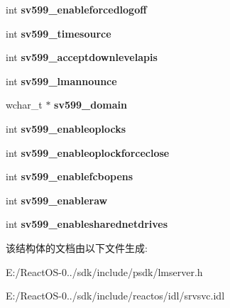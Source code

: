\begin{DoxyCompactItemize}
int {\bfseries sv599\+\_\+enableforcedlogoff}
\item 
\mbox{\label{struct___s_e_r_v_e_r___i_n_f_o__599_a3a3ca489cbe86e802b096e3dfcaddde5}} 
int {\bfseries sv599\+\_\+timesource}
\item 
\mbox{\label{struct___s_e_r_v_e_r___i_n_f_o__599_a28696bd1d75a0c8e34987162ced56291}} 
int {\bfseries sv599\+\_\+acceptdownlevelapis}
\item 
\mbox{\label{struct___s_e_r_v_e_r___i_n_f_o__599_a7f5bd7452b2840174860f6a9428adc36}} 
int {\bfseries sv599\+\_\+lmannounce}
\item 
\mbox{\label{struct___s_e_r_v_e_r___i_n_f_o__599_ab7d3dd1a8ebe12ba89842f8eedaafafe}} 
wchar\+\_\+t $\ast$ {\bfseries sv599\+\_\+domain}
\item 
\mbox{\label{struct___s_e_r_v_e_r___i_n_f_o__599_ac409de2775f887845e9c6df9b1843335}} 
int {\bfseries sv599\+\_\+enableoplocks}
\item 
\mbox{\label{struct___s_e_r_v_e_r___i_n_f_o__599_ae351f5ac7c9e9cdf3081d30978489b56}} 
int {\bfseries sv599\+\_\+enableoplockforceclose}
\item 
\mbox{\label{struct___s_e_r_v_e_r___i_n_f_o__599_a999eed8b077c806ffc3ab6c2a07bc5c5}} 
int {\bfseries sv599\+\_\+enablefcbopens}
\item 
\mbox{\label{struct___s_e_r_v_e_r___i_n_f_o__599_ac4e6cef5f90983d73181199331363f8e}} 
int {\bfseries sv599\+\_\+enableraw}
\item 
\mbox{\label{struct___s_e_r_v_e_r___i_n_f_o__599_a5b36c9f3bf65ce7d80d0141c66cae660}} 
int {\bfseries sv599\+\_\+enablesharednetdrives}
\end{DoxyCompactItemize}


该结构体的文档由以下文件生成\+:\begin{DoxyCompactItemize}
\item 
E\+:/\+React\+O\+S-\/0../sdk/include/psdk/lmserver.\+h\item 
E\+:/\+React\+O\+S-\/0../sdk/include/reactos/idl/srvsvc.\+idl\end{DoxyCompactItemize}
